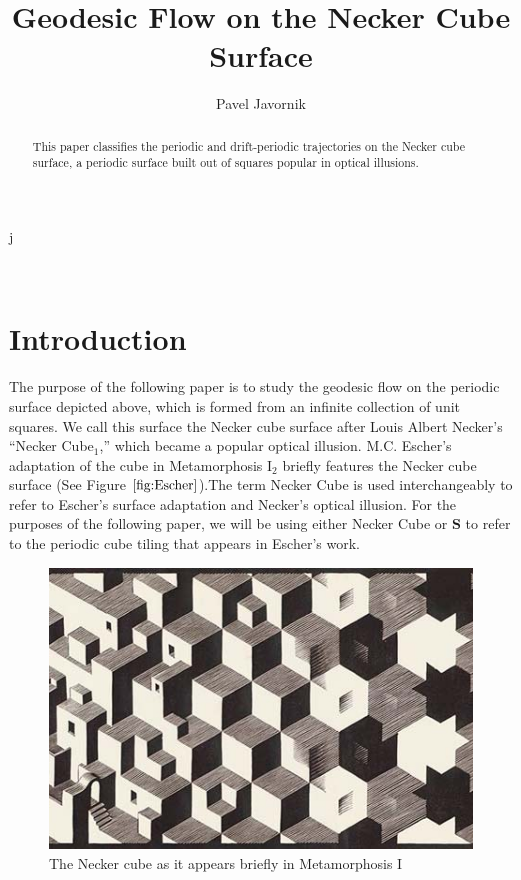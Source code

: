 j\documentclass[]{article}
\title{Geodesic Flow on the Necker Cube Surface}
\date{}
\author{Pavel Javornik}
\begin{document}
\maketitle



\begin{center}

\\
\end{center}

\begin{abstract}
This paper classifies the periodic and drift-periodic trajectories on the Necker cube surface, a periodic surface built out of squares popular in optical illusions.
\end{abstract}



\newpage
\section{Introduction}

The purpose of the following paper is to study the geodesic flow on the periodic surface depicted above, which is formed from an infinite collection of unit squares. We call this surface the Necker cube surface after Louis Albert Necker's ``Necker Cube$_{1}$,'' which became a popular optical illusion. M.C. Escher's adaptation of the cube in Metamorphosis I$_{2}$ briefly features the Necker cube surface (See Figure $\ref{fig:Escher}$).The term Necker Cube is used interchangeably to refer to Escher's surface adaptation and Necker's optical illusion. For the purposes of the following paper, we will be using either Necker Cube or $\mathbf{S}$ to refer to the periodic cube tiling that appears in Escher's work.


\begin{figure}[H]
\begin{center}
\includegraphics[scale=0.5]{escher.jpg}
\caption{The Necker cube as it appears briefly in Metamorphosis I}
\label{fig:Escher}
\end{center}
\end{figure}
\end{document}
